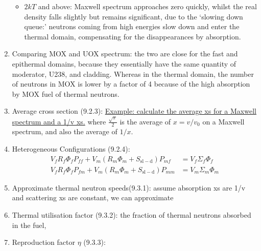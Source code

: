 \documentclass{school-22.211-notes}
\begin{document}
\begin{enumerate}
\begin{itemize}
    \item $2kT$ and above: Maxwell spectrum approaches zero quickly, whilst the real density falls slightly but remains significant, due to the `slowing down queue:' neutrons coming from high energies slow down and enter the thermal domain, compensating for the disappearances by absorption. 
  \end{itemize}
\item Comparing MOX and UOX spectrum: the two are close for the fast and epithermal domains, because they essentially have the same quantity of moderator, U238, and cladding. Whereas in the thermal domain, the number of neutrons in MOX is lower by a factor of 4 because of the high absorption by MOX fuel of thermal neutrons. 
\item Average cross section (9.2.3): 
  \uline{Example: calculate the average xs for a Maxwell spectrum and a 1/v xs.} 
  where $\frac{\sqrt{\pi}}{2}$ is the average of $x = v/v_0$ on a Maxwell spectrum, and also the average of $1/x$. 
\item Heterogeneous Configurations (9.2.4):
  \begin{align}
    V_f R_f \Phi_f P_{ff} + V_m (R_m \Phi_m + S_{\mathrm{sl-d}} ) P_{mf} &= V_f \Sigma_f \Phi_f \\
    V_fR_f \Phi_f P_{fm} + V_m(R_m \Phi_m + S_{\mathrm{sl-d}}) P_{mm} &= V_m \Sigma_m \Phi_m 
  \end{align}
\item Approximate thermal neutron speeds(9.3.1): assume absorption xs are 1/v and scattering xs are constant, we can approximate
\item Thermal utilisation factor (9.3.2): the fraction of thermal neutrons absorbed in the fuel,
\item Reproduction factor $\eta$ (9.3.3):

\end{enumerate}


\end{document}
